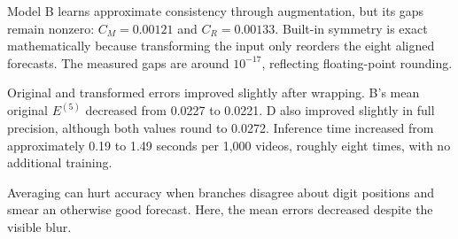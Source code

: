 Model B learns approximate consistency through augmentation, but its gaps remain nonzero: $C_M=0.00121$ and $C_R=0.00133$. Built-in symmetry is exact mathematically because transforming the input only reorders the eight aligned forecasts. The measured gaps are around $10^{-17}$, reflecting floating-point rounding.

Original and transformed errors improved slightly after wrapping. B's mean original $E^{(5)}$ decreased from 0.0227 to 0.0221. D also improved slightly in full precision, although both values round to 0.0272. Inference time increased from approximately 0.19 to 1.49 seconds per 1,000 videos, roughly eight times, with no additional training.

Averaging can hurt accuracy when branches disagree about digit positions and smear an otherwise good forecast. Here, the mean errors decreased despite the visible blur.
